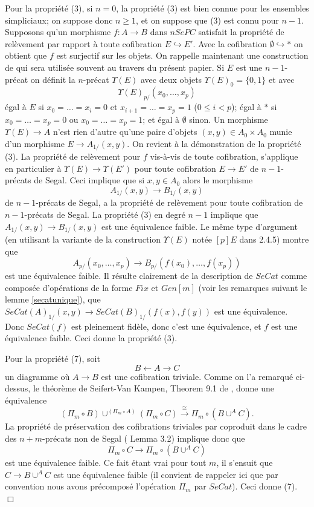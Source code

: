 \documentclass[12pt]{article}
\newcommand{\eop}{\hfill $\Box$\vspace{.1in}}
\begin{document}
Pour la propri\'et\'e (3),
si $n=0$, la propri\'et\'e (3) est bien connue pour
les ensembles simpliciaux; on suppose donc $n\geq 1$, et on suppose que (3)
est connu pour $n-1$.  Supposons qu'un morphisme $f:A\rightarrow B$
dans $nSePC$ satisfait la propri\'et\'e de rel\`evement par rapport \`a toute
cofibration $E\hookrightarrow E'$. Avec la cofibration $\emptyset
\hookrightarrow \ast$ on
obtient que $f$ est surjectif sur les objets. On rappelle maintenant une
construction de \cite{limits} qui sera utilis\'ee souvent au travers du
pr\'esent papier. Si $E$ est une $n-1$-pr\'ecat on d\'efinit la $n$-pr\'ecat
$\Upsilon (E)$ avec deux objets $\Upsilon (E)_0 = \{ 0,1\}$ et avec
$$
\Upsilon (E)_{p/}(x_0,\ldots , x_p)
$$
\'egal \`a $E$
si $x_0=\ldots = x_i=0$ et $x_{i+1}=\ldots = x_p = 1$ ($0\leq i<p$); \'egal
\`a $\ast$
si $x_0=\ldots = x_p=0$ ou $x_0=\ldots = x_p=1$; et \'egal \`a $\emptyset$
sinon. Un morphisme $\Upsilon (E)\rightarrow A$
 n'est rien d'autre
qu'une paire d'objets $(x,y)\in A_0\times A_0$ munie d'un morphisme
$E\rightarrow
A_{1/}(x,y)$. On revient \`a la d\'emonstration de la propri\'et\'e (3). La
propri\'et\'e de rel\`evement pour $f$ vis-\`a-vis de toute cofibration,
s'applique en particulier \`a $\Upsilon (E)\rightarrow \Upsilon (E')$ pour
toute cofibration $E\rightarrow E'$ de $n-1$-pr\'ecats de Segal. Ceci implique
que si $x,y\in A_0$ alors le morphisme
$$
A_{1/}(x,y)\rightarrow B_{1/}(x,y)
$$
de $n-1$-pr\'ecats de Segal, a la propri\'et\'e de rel\`evement pour toute
cofibration de $n-1$-pr\'ecats de Segal. La propri\'et\'e (3) en degr\'e $n-1$
implique que $A_{1/} (x,y)\rightarrow B_{1/}(x,y)$ est une \'equivalence
faible. Le m\^eme type d'argument (en utilisant la variante de
la construction $\Upsilon (E)$ not\'ee $[p]E$
dans \cite{limits} 2.4.5) montre que
$$
A_{p/}(x_0,\ldots , x_p)\rightarrow B_{p/}(f(x_0),\ldots , f(x_p))
$$
est une
\'equivalence faible. Il r\'esulte clairement de la description de $SeCat$ comme
compos\'ee d'op\'erations de la forme $Fix$ et $Gen[m]$ (voir les remarques
suivant le lemme \ref{secatunique}), que $SeCat(A)_{1/}(x,y)\rightarrow
SeCat(B)_{1/}(f(x), f(y))$ est une \'equivalence. Donc $SeCat(f)$ est pleinement
fid\`ele, donc c'est une \'equivalence, et $f$ est une \'equivalence faible.
Ceci donne la propri\'et\'e (3).

Pour la propri\'et\'e (7), soit
$$
B\leftarrow     A\rightarrow C
$$
un diagramme o\`u $A\rightarrow B$ est une cofibration triviale. Comme on l'a
remarqu\'e ci-dessus,  le th\'eor\`eme de Seifert-Van Kampen, Theorem 9.1 de
\cite{nCAT}, donne une \'equivalence
$$
(\Pi _m\circ B) \cup ^{(\Pi _m \circ A)}(\Pi _m \circ C)
\stackrel{\cong}{\rightarrow} \Pi _m\circ (B\cup ^AC).
$$
La propri\'et\'e de pr\'eservation des cofibrations triviales par coproduit
dans le cadre
des $n+m$-pr\'ecats non de Segal (\cite{nCAT} Lemma 3.2) implique donc que
$$
\Pi _m \circ C\rightarrow
\Pi _m \circ (B\cup ^AC)
$$
est une \'equivalence faible. Ce fait \'etant vrai pour tout $m$, il s'ensuit
que $C\rightarrow
B\cup ^AC$ est une \'equivalence faible (il convient de rappeler ici que par
convention nous avons pr\'ecompos\'e l'op\'eration $\Pi_m$ par $SeCat$). Ceci
donne (7).
\eop
\end{document}
